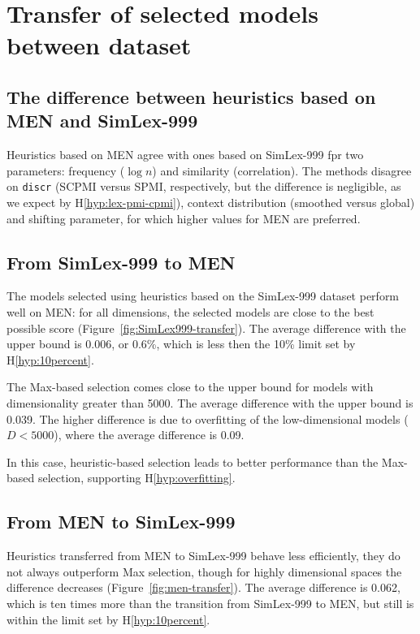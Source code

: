 \section{Transfer of selected models between dataset}
\label{sec:select-model-transf}

\subsection{The difference between heuristics based on MEN and SimLex-999}

Heuristics based on MEN agree with ones based on SimLex-999 fpr two parameters: frequency ($\log n$) and similarity (correlation). The methods disagree on \texttt{discr} (SCPMI versus SPMI, respectively, but the difference is negligible, as we expect by H\ref{hyp:lex-pmi-cpmi}), context distribution (smoothed versus global) and shifting parameter, for which higher values for MEN are preferred.

\subsection{From SimLex-999 to MEN}
\label{sec:simlex-men}



The models selected using heuristics based on the SimLex-999 dataset perform well on MEN: for all dimensions, the selected models are close to the best possible score (Figure~\ref{fig:SimLex999-transfer}). The average difference with the upper bound is 0.006, or 0.6\%, which is less then the 10\% limit set by H\ref{hyp:10percent}.
%
%
%

The Max-based selection comes close to the upper bound for models with dimensionality greater than 5000. The average difference with the upper bound is 0.039. The higher difference is due to overfitting of the low-dimensional models ($D < 5000$), where the average difference is 0.09.

In this case, heuristic-based selection leads to better performance than the Max-based selection, supporting H\ref{hyp:overfitting}.

\subsection{From MEN to SimLex-999}

Heuristics transferred from MEN to SimLex-999 behave less efficiently, they do not always outperform Max selection, though for highly dimensional spaces the difference decreases (Figure~\ref{fig:men-transfer}). The average difference is 0.062, which is ten times more than the transition from SimLex-999 to MEN, but still is within the limit set by H\ref{hyp:10percent}.


